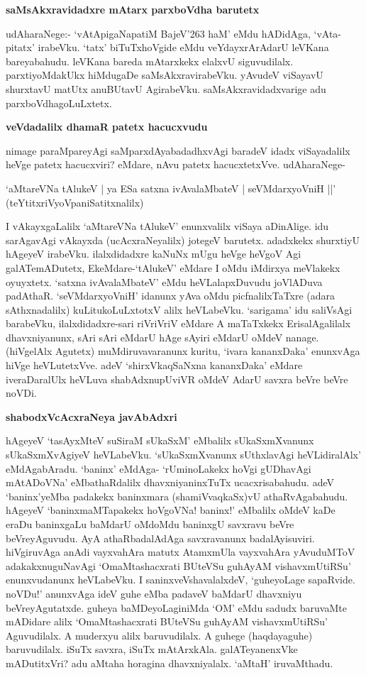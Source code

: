 \textbf{saMsAkxravidadxre mAtarx parxboVdha barutetx}

udAharaNege:- `vAtApigaNapatiM BajeV\char'263 haM' eMdu hADidAga, `vAta-pitatx' irabeVku. `tatx' biTuTxhoVgide eMdu veYdayxrArAdarU leVKana bareyabahudu. leVKana bareda mAtarxkekx elalxvU siguvudilalx. parxtiyoMdakUkx hiMdugaDe saMsAkxravirabeVku. yAvudeV viSayavU shurxtavU matUtx anuBUtavU AgirabeVku. saMsAkxravidadxvarige adu parxboVdhagoLuLxtetx.

\textbf{veVdadalilx dhamaR patetx hacucxvudu}

nimage paraMpareyAgi saMparxdAyabadadhxvAgi baradeV idadx viSayadalilx heVge patetx hacucxviri? eMdare, nAvu patetx hacucxtetxVve. udAharaNege-

\begin{shloka}
`aMtareVNa tAlukeV | ya ESa satxna ivAvalaMbateV | seVMdarxyoVniH ||'\\
\hfill{(teYtitxriVyoVpaniSatitxnalilx)}
\end{shloka}

I vAkayxgaLalilx `aMtareVNa tAlukeV' enunxvalilx viSaya aDinAlige. idu sarAgavAgi vAkayxda (ucAcxraNeyalilx) jotegeV barutetx. adadxkekx shurxtiyU hAgeyeV irabeVku. ilalxdidadxre kaNuNx mUgu heVge heVgoV Agi galATemADutetx, EkeMdare-`tAlukeV' eMdare I oMdu iMdirxya meVlakekx oyuyxtetx. `satxna ivAvalaMbateV' eMdu heVLalapxDuvudu joVlADuva padAthaR. `seVMdarxyoVniH' idanunx yAva oMdu picfnalilxTaTxre (adara sAthxnadalilx) kuLitukoLuLxtotxV alilx heVLabeVku. `sarigama' idu saliVsAgi barabeVku, ilalxdidadxre-sari riVriVriV eMdare A maTaTxkekx ErisalAgalilalx dhavxniyanunx, sAri sAri eMdarU hAge sAyiri eMdarU oMdeV nanage. (hiVgelAlx Agutetx) muMdiruvavaranunx kuritu, `ivara kananxDaka' enunxvAga hiVge heVLutetxVve. adeV `shirxVkaqSaNxna kananxDaka' eMdare iveraDaralUlx heVLuva shabAdxnupUviVR oMdeV AdarU savxra beVre beVre noVDi.

\textbf{shabodxVcAcxraNeya javAbAdxri}

hAgeyeV `tasAyxMteV suSiraM sUkaSxM' eMbalilx sUkaSxmXvanunx sUkaSxmXvAgiyeV heVLabeVku. `sUkaSxmXvanunx sUthxlavAgi heVLidiralAlx' 
eMdAgabAradu. `baninx' eMdAga- `rUminoLakekx hoVgi gUDhavAgi mAtADoVNa' eMbathaRdalilx dhavxniyaninxTuTx ucacxrisabahudu. adeV `baninx'yeMba padakekx baninxmara (shamiVvaqkaSx)vU athaRvAgabahudu. hAgeyeV `baninxmaMTapakekx hoVgoVNa! baninx!' eMbalilx oMdeV kaDe eraDu baninxgaLu baMdarU oMdoMdu baninxgU savxravu beVre beVreyAguvudu. AyA athaRbadalAdAga savxravanunx badalAyisuviri. hiVgiruvAga anAdi vayxvahAra matutx AtamxmUla vayxvahAra yAvuduMToV adakakxnuguNavAgi `OmaMtashacxrati BUteVSu guhAyAM vishavxmUtiRSu' enunxvudanunx heVLabeVku. I saninxveVshavalalxdeV, `guheyoLage sapaRvide. noVDu!' anunxvAga ideV guhe eMba padaveV baMdarU dhavxniyu beVreyAgutatxde. guheya baMDeyoLaginiMda `OM' eMdu sadudx baruvaMte mADidare alilx `OmaMtashacxrati BUteVSu guhAyAM vishavxmUtiRSu' Aguvudilalx. A muderxyu alilx baruvudilalx. A guhege (haqdayaguhe) baruvudilalx. iSuTx savxra, iSuTx mAtArxkAla. galATeyanenxVke mADutitxVri? adu aMtaha horagina dhavxniyalalx. `aMtaH' iruvaMthadu.


